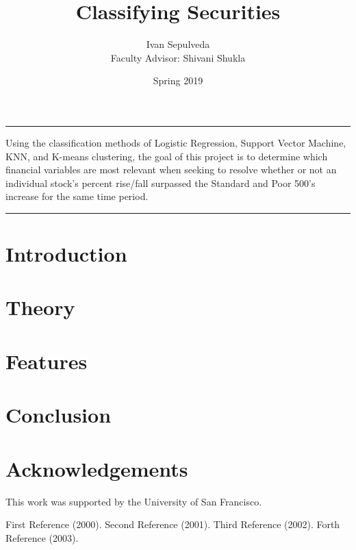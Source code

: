 \documentclass[12pt]{article}
\title{Classifying Securities\vspace{-2ex}}
\author{Ivan Sepulveda \\ Faculty Advisor: Shivani Shukla}
\date{\vspace{-1.5ex}Spring 2019\vspace{-2ex}}
\begin{document}
\maketitle
\hrule
\vspace{2ex}
Using the classification methods of Logistic Regression, Support Vector Machine, KNN, and K-means clustering, the goal of this project is to determine which financial variables are most relevant when seeking to resolve whether or not an individual stock's percent rise/fall surpassed the Standard and Poor 500's increase for the same time period.

\vspace{0.001cm}
\hrule


\section{Introduction}

\section{Theory}

\section{Features}

\section{Conclusion}

\section{Acknowledgements}
This work was supported by the University of San Francisco.

\begin{thebibliography}{9}
	First Reference (2000).
	Second Reference (2001).
	Third Reference (2002).
	Forth Reference (2003).


\end{thebibliography}
\end{document}
